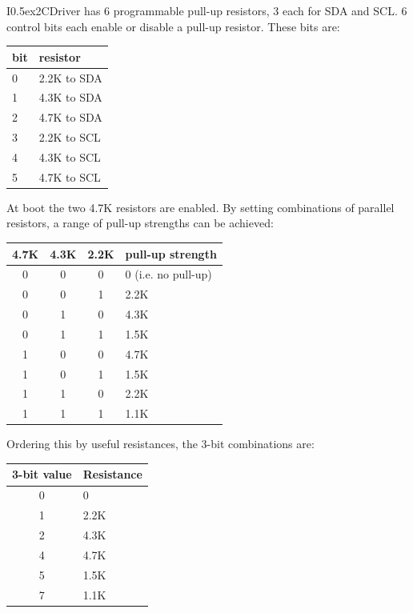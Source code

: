 \documentclass{article}
\newcommand{\two}{\raise0.5ex\hbox{\footnotesize{2}}}
\newcommand{\iicdriver}{I\two{}CDriver}
\newcommand{\gap}{\vspace{10pt}}
\begin{document}
\iicdriver{} has 6 programmable pull-up resistors, 3 each for SDA and SCL.
6 control bits each enable or disable a pull-up resistor. These bits are:

\begin{center}\begin{tabular}{ll}
\hline
bit & resistor \\
\hline
 0  & 2.2K to SDA \\
 1  & 4.3K to SDA \\
 2  & 4.7K to SDA \\
 3  & 2.2K to SCL \\
 4  & 4.3K to SCL \\
 5  & 4.7K to SCL \\
\hline
\end{tabular}\end{center}\gap

At boot the two 4.7K resistors are enabled.
By setting combinations of parallel resistors, a range of pull-up strengths can be achieved:

\begin{center}\begin{tabular}{cccl}
\hline
4.7K & 4.3K & 2.2K & pull-up strength \\
\hline
 0   &  0   &   0  & 0 (i.e. no pull-up) \\
 0   &  0   &   1  & 2.2K \\
 0   &  1   &   0  & 4.3K \\
 0   &  1   &   1  & 1.5K \\
 1   &  0   &   0  & 4.7K \\
 1   &  0   &   1  & 1.5K \\
 1   &  1   &   0  & 2.2K \\
 1   &  1   &   1  & 1.1K \\
\hline
\end{tabular}\end{center}\gap

Ordering this by useful resistances, the 3-bit combinations are:

\begin{center}\begin{tabular}{cl}
\hline
3-bit value & Resistance \\
\hline
  0         & 0 \\
  1         & 2.2K \\
  2         & 4.3K \\
  4         & 4.7K \\
  5         & 1.5K \\
  7         & 1.1K \\
\hline
\end{tabular}\end{center}\gap
\end{document}
